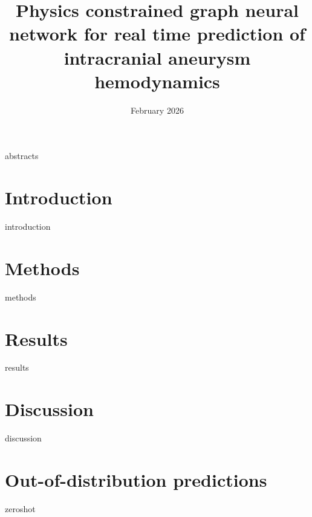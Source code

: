 \documentclass[12pt]{article}
\title{Physics constrained graph neural network for real time prediction of intracranial aneurysm hemodynamics}
\date{February 2026}
\begin{document}
\maketitle

{abstracts}

\section{Introduction}
{introduction}

\section{Methods} \label{sec:Methods}
{methods}

\section{Results}
{results}

\section{Discussion}
{discussion}

\section{Out-of-distribution predictions}
{zeroshot}



\end{document}
